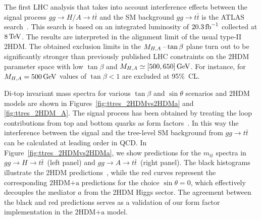 \documentclass[a4paper, 11pt,notoc]{article}
\newcommand{\hdma}{\ensuremath{\textrm{2HDM+a}}\xspace}
\begin{document}
The first LHC analysis that takes into account interference effects between the signal process $gg \to H/A \to t \bar t$ and the SM background $gg \to t \bar t$ is the ATLAS search~\cite{Aaboud:2017hnm}. This search  is based on an integrated luminosity of $20.3 \, {\rm fb}^{-1}$ collected at $8 \, {\rm TeV}$. The results are interpreted in the alignment limit of the usual type-II 2HDM. The obtained  exclusion limits in the $M_{H,A}\hspace{0.5mm}$--$\hspace{0.5mm} \tan \beta$ plane turn out to be significantly stronger than previously published LHC constraints on the 2HDM parameter space with low $\tan \beta$ and $M_{H,A} \simeq [500, 650] \, {\rm GeV}$. For instance,  for $M_{H,A} = 500 \, {\rm GeV}$ values of $\tan \beta < 1$ are excluded at 95\%~CL. 

Di-top invariant mass spectra for various $\tan \beta$ and $\sin \theta$ scenarios and 2HDM models are shown in Figures~\ref{fig:ttres_2HDMvs2HDMa} and \ref{fig:ttres_2HDM_A}. The signal process has been obtained by treating the loop contributions from top and bottom quarks as form factors~\cite{FranzosiZhang}. In this way the interference between the signal and the tree-level SM background from $gg \to t \bar t$ can be calculated at leading order in QCD. In Figure~\ref{fig:ttres_2HDMvs2HDMa}, we show predictions for the $m_{t \bar t}$ spectra in $gg \to H \to t \bar t$~(left panel) and $gg \to A \to t \bar t$~(right panel). The black histograms illustrate the 2HDM predictions~\cite{Aaboud:2017hnm}, while the red curves represent the corresponding \hdma predictions for the choice $\sin \theta = 0$, which effectively decouples the mediator $a$ from the 2HDM Higgs sector. The agreement between the black and red predictions serves as a validation of our form factor implementation in the \hdma model. 
\end{document}
